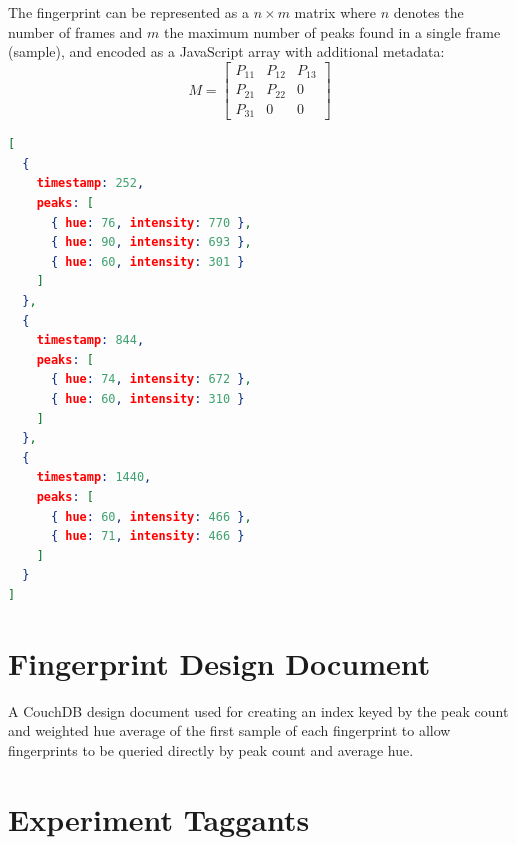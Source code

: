 \documentclass[thesis.tex]{subfiles}
\begin{document}
The fingerprint can be represented as a $n \times m$ matrix where $n$ denotes the number of frames and $m$ the maximum number of peaks found in a single frame (sample), and encoded as a JavaScript array with additional metadata:
\[
M=
  \begin{bmatrix}
    P_{11} & P_{12} & P_{13} \\
    P_{21} & P_{22} & 0 \\
    P_{31} & 0 & 0
  \end{bmatrix}
\]
\begin{lstlisting}[language=json,firstnumber=1]
[
  {
    timestamp: 252,
    peaks: [
      { hue: 76, intensity: 770 },
      { hue: 90, intensity: 693 },
      { hue: 60, intensity: 301 }
    ]
  },
  {
    timestamp: 844,
    peaks: [
      { hue: 74, intensity: 672 },
      { hue: 60, intensity: 310 }
    ]
  },
  {
    timestamp: 1440,
    peaks: [
      { hue: 60, intensity: 466 },
      { hue: 71, intensity: 466 }
    ]
  }
]
\end{lstlisting}


\chapter{Fingerprint Design Document}
\label{appendix:fingerprint-design-doc}
A CouchDB design document used for creating an index keyed by the peak count and weighted hue average of the first sample of each fingerprint to allow fingerprints to be queried directly by peak count and average hue.
\vspace{5mm}



\chapter{Experiment Taggants}
\label{appendix:taggants}
\end{document}
